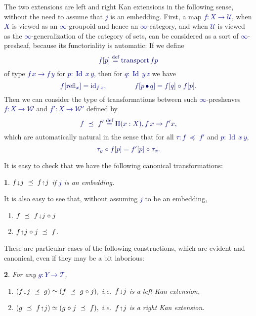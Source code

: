 \documentclass[10pt]{article}
\newcommand{\db}{\textcolor{darkblue}}
\newcommand{\m}[1]{\db{$#1$}}
\newcommand{\M}[1]{\[\db{#1}\]}
\newcommand{\pcomp}{\operatorname{\bullet}}
\newcommand{\transport}{\operatorname{transport}}
\newcommand{\id}{\operatorname{id}}
\newcommand{\comp}{\mathrel{\circ}}
\newcommand{\U}{\mathcal{U}}
\newcommand{\W}{\mathcal{W}}
\newcommand{\T}{\mathcal{T}}
\newcommand{\Id}{\operatorname{Id}}
\newcommand{\refl}{\operatorname{refl}}
\newcommand{\eqdef}{\overset{\text{def}}{=}}
\newcommand{\edown}{\scaleobj{0.7}{\,\downarrow\,}}
\newcommand{\eup}{\scaleobj{0.7}{\,\uparrow\,}}
\newcommand{\wps}{\mathrel{\,\,\preceq\,\,}}
\newtheorem{numbered}{}
\theoremstyle{definition}
\begin{document}
The two extensions are left and right Kan extensions in the following
sense, without the need to assume that \m{j} is an embedding. First, a
map \m{f:X \to \U}, when \m{X} is viewed as an \m{\infty}-groupoid and
hence an \m{\infty}-category, and when \m{\U} is viewed as the
\m{\infty}-generalization of the category of sets, can be considered
as a sort of \m{\infty}-presheaf, because its functoriality is
automatic: If we define
%
\M{f [ p ] \eqdef \transport f p}
%
of type \m{f\, x \to f\, y} for \m{p : \Id \, x \, y}, then for
\m{q : \Id \, y \, z} we have
%
\M{ f [
  \refl_x ] = \id_{f \, x}, \qquad\qquad f [p \pcomp q] = f [q] \comp f
  [p].
}
Then we can consider the type of transformations between such
\m{\infty}-presheaves \m{f : X \to \W} and \m{f' : X \to \W'} defined by
%
\M{
  f \wps f' \eqdef \Pi (x : X), f \, x \to  f' x,
}
%
which are automatically natural in the sense that for all \m{\tau: f \wps f'} and \m{p : \Id \, x \, y},
%
\M{
  \tau_y \comp f [ p ] = f' [p] \comp \tau_x.
}
%

It is easy to check that we have the following canonical transformations:
\begin{numbered}
  \m{f \edown j \wps f \eup j} if \m{j} is an embedding.
\end{numbered}
It is also easy to see that, without assuming \m{j} to be an embedding,
  \begin{enumerate}
  \item \m{f \wps f \edown j \comp j}
  \item \m{f \eup j \comp j \wps f}.
  \end{enumerate}
  These are particular cases of the following constructions, which are
  evident and canonical, even if they may be a bit
  laborious:
\begin{numbered} For any \m{g : Y \to \T},
    \begin{enumerate}
    \item \m{(f \edown j \wps g) \simeq (f \wps g \comp j),} \quad i.e.\ \m{f \edown j} is a left Kan extension,
    \item \m{(g \wps f \eup j) \simeq (g \comp j \wps f),} \quad i.e.\ \m{f \eup j} is a right Kan extension.
    \end{enumerate}
\end{numbered}
\end{document}
